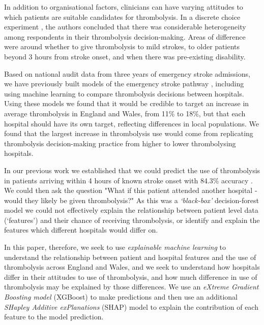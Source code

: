 In addition to organisational factors, clinicians can have varying attitudes to which patients are suitable candidates for thrombolysis. In a discrete choice experiment \cite{de_brun_factors_2018}, the authors concluded that there was considerable heterogeneity among respondents in their thrombolysis decision-making. Areas of difference were around whether to give thrombolysis to mild strokes, to older patients beyond 3 hours from stroke onset, and when there was pre-existing disability.

Based on national audit data from three years of emergency stroke admissions, we have previously built models of the emergency stroke pathway \cite{allen_using_2022, allen_use_2022}, including using machine learning to compare thrombolysis decisions between hospitals. Using these models we found that it would be credible to target an increase in average thrombolysis in England and Wales, from 11\% to 18\%, but that each hospital should have its own target, reflecting differences in local populations. We found that the largest increase in thrombolysis use would come from replicating thrombolysis decision-making practice from higher to lower thrombolysing hospitals. 


In our previous work we established that we could predict the use of thrombolysis in patients arriving within 4 hours of known stroke onset with 84.3\% accuracy \cite{allen_use_2022}. We could then ask the question "What if this patient attended another hospital - would they likely be given thrombolysis?" As this was a \emph{`black-box'} decision-forest model we could not effectively explain the relationship between patient level data (`features') and their chance of receiving thrombolysis, or identify and explain the features which different hospitals would differ on.


In this paper, therefore, we seek to use \emph{explainable machine learning} to understand the relationship between patient and hospital features and the use of thrombolysis across England and Wales, and we seek to understand how hospitals differ in their attitudes to use of thrombolysis, and how much difference in use of thrombolysis may be explained by those differences. We use an \emph{eXtreme Gradient Boosting model \cite{chen_xgboost_2016}} (XGBoost) to make predictions and then use an additional \emph{SHapley Additive exPlanations} \cite{lundberg_unified_2017} (SHAP) model to explain the contribution of each feature to the model prediction.